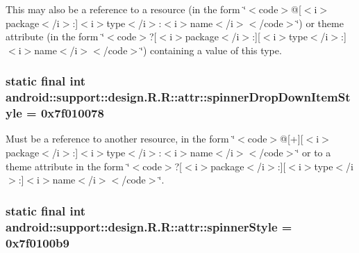 This may also be a reference to a resource (in the form \char`\"{}$<$code$>$@\mbox{[}$<$i$>$package$<$/i$>$:\mbox{]}$<$i$>$type$<$/i$>$:$<$i$>$name$<$/i$>$$<$/code$>$\char`\"{}) or theme attribute (in the form \char`\"{}$<$code$>$?\mbox{[}$<$i$>$package$<$/i$>$:\mbox{]}\mbox{[}$<$i$>$type$<$/i$>$:\mbox{]}$<$i$>$name$<$/i$>$$<$/code$>$\char`\"{}) containing a value of this type. \hypertarget{classandroid_1_1support_1_1design_1_1_r_1_1attr_db905791bc7bc1cb74f0e79b77f9f854}{
\subsubsection[{spinnerDropDownItemStyle}]{\setlength{\rightskip}{0pt plus 5cm}static final int android::support::design.R.R::attr::spinnerDropDownItemStyle = 0x7f010078}}
\label{classandroid_1_1support_1_1design_1_1_r_1_1attr_db905791bc7bc1cb74f0e79b77f9f854}


Must be a reference to another resource, in the form \char`\"{}$<$code$>$@\mbox{[}+\mbox{]}\mbox{[}$<$i$>$package$<$/i$>$:\mbox{]}$<$i$>$type$<$/i$>$:$<$i$>$name$<$/i$>$$<$/code$>$\char`\"{} or to a theme attribute in the form \char`\"{}$<$code$>$?\mbox{[}$<$i$>$package$<$/i$>$:\mbox{]}\mbox{[}$<$i$>$type$<$/i$>$:\mbox{]}$<$i$>$name$<$/i$>$$<$/code$>$\char`\"{}. \hypertarget{classandroid_1_1support_1_1design_1_1_r_1_1attr_1db787a6d9c8c27b7bd52f3af9070b2e}{
\subsubsection[{spinnerStyle}]{\setlength{\rightskip}{0pt plus 5cm}static final int android::support::design.R.R::attr::spinnerStyle = 0x7f0100b9}}
\label{classandroid_1_1support_1_1design_1_1_r_1_1attr_1db787a6d9c8c27b7bd52f3af9070b2e}


